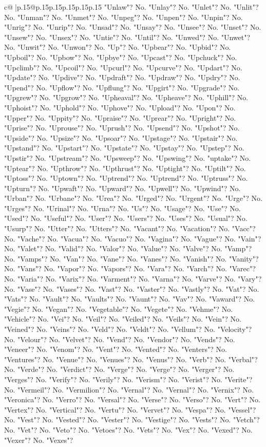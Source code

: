 \documentclass{article}
\begin{document}
{\begin{supertabular}{c@{$\;$}|p{.15\linewidth}@{}p{.15\linewidth}p{.15\linewidth}p{.15\linewidth}p{.15\linewidth}p{.15\linewidth}}
{{{"Unlaw"? No. "Unlay"? No. "Unlet"? No. "Unlit"? No. "Unman"? No. "Unmet"? No. "Unpeg"? No. "Unpen"? No. "Unpin"? No. "Unrig"? No. "Unrip"? No. "Unsad"? No. "Unsay"? No. "Unsee"? No. "Unset"? No. "Unsew"? No. "Unsex"? No. "Untie"? No. "Until"? No. "Unwed"? No. "Unwet"? No. "Unwit"? No. "Unwon"? No. "Up"? No. "Upbear"? No. "Upbid"? No. "Upboil"? No. "Upbow"? No. "Upbye"? No. "Upcast"? No. "Upchuck"? No. "Upclimb"? No. "Upcoil"? No. "Upcurl"? No. "Upcurve"? No. "Updart"? No. "Update"? No. "Updive"? No. "Updraft"? No. "Updraw"? No. "Updry"? No. "Upend"? No. "Upflow"? No. "Upflung"? No. "Upgirt"? No. "Upgrade"? No. "Upgrew"? No. "Upgrow"? No. "Upheaval"? No. "Upheave"? No. "Uphill"? No. "Uphoist"? No. "Uphold"? No. "Uphove"? No. "Upload"? No. "Upon"? No. "Upper"? No. "Uppity"? No. "Upraise"? No. "Uprear"? No. "Upright"? No. "Uprise"? No. "Uprouse"? No. "Uprush"? No. "Upsend"? No. "Upshot"? No. "Upside"? No. "Upsize"? No. "Upsoar"? No. "Upstage"? No. "Upstair"? No. "Upstand"? No. "Upstart"? No. "Upstate"? No. "Upstay"? No. "Upstep"? No. "Upstir"? No. "Upstream"? No. "Upsweep"? No. "Upswing"? No. "uptake"? No. "Uptear"? No. "Upthrow"? No. "Upthrust"? No. "Uptight"? No. "Uptilt"? No. "Uptoss"? No. "Uptown"? No. "Uptrend"? No. "Uptrend"? No. "Uptruss"? No. "Upturn"? No. "Upwaft"? No. "Upward"? No. "Upwell"? No. "Upwind"? No. "Urban"? No. "Urbane"? No. "Urea"? No. "Urged"? No. "Urgent"? No. "Urge"? No. "Urges"? No. "Urinal"? No. "Urna"? No. "Us"? No. "Usage"? No. "Use"? No. "Used"? No. "Useful"? No. "User"? No. "Users"? No. "Uses"? No. "Usual"? No. "Usurp"? No. "Utter"? No. "Utters"? No. "Vacant"? No. "Vacation"? No. "Vacc"? No. "Vache"? No. "Vacua"? No. "Vacuo"? No. "Vagina"? No. "Vague"? No. "Vain"? No. "Valet"? No. "Valid"? No. "Valor"? No. "Value"? No. "Valve"? No. "Vamp"? No. "Vamps"? No. "Van"? No. "Vane"? No. "Vanes"? No. "Vanish"? No. "Vanity"? No. "Vans"? No. "Vapor"? No. "Vapors"? No. "Vara"? No. "Varch"? No. "Varec"? No. "Varia"? No. "Varix"? No. "Varment"? No. "Varna"? No. "Varve"? No. "Vary"? No. "Vase"? No. "Vases"? No. "Vast"? No. "Vaster"? No. "Vastly"? No. "Vat"? No. "Vats"? No. "Vault"? No. "Vaults"? No. "Vaunt"? No. "Vav"? No. "Vaward"? No. "Vegie"? No. "Vegan"? No. "Vegetable"? No. "Vegete"? No. "Vehme"? No. "Vehicle"? No. "Vei"? No. "Veil"? No. "Veiled"? No. "Veils"? No. "Vein"? No. "Veined"? No. "Veins"? No. "Veld"? No. "Veldt"? No. "Vellum"? No. "Velocity"? No. "Velour"? No. "Velvet"? No. "Vend"? No. "Vendor"? No. "Vends"? No. "Veneer"? No. "Venom"? No. "Vent"? No. "Vented"? No. "Venters"? No. "Ventures"? No. "Venue"? No. "Venues"? No. "Venus"? No. "Verb"? No. "Verbal"? No. "Verde"? No. "Verdict"? No. "Verge"? No. "Verge"? No. "Verger"? No. "Verges"? No. "Verify"? No. "Verily"? No. "Verism"? No. "Verist"? No. "Verite"? No. "Vermeil"? No. "Vermilion"? No. "Vernal"? No. "Vernal"? No. "Vernix"? No. "Veronica"? No. "Verro"? No. "Versal"? No. "Verse"? No. "Verso"? No. "Vert"? No. "Vertex"? No. "Vertical"? No. "Vertu"? No. "Vervet"? No. "Vespa"? No. "Vessel"? No. "Vest"? No. "Vested"? No. "Vester"? No. "Vestige"? No. "Vests"? No. "Vetch"? No. "Vet"? No. "Veto"? No. "Vetoes"? No. "Vets"? No. "Vex"? No. "Vexed"? No. "Vexer"? No. "Vexes"? }}}
\end{supertabular}}
\end{document}
